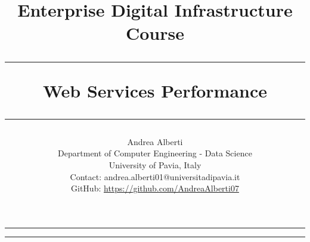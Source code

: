 \documentclass[a4paper,10pt]{article}
\title{\Large {Enterprise Digital Infrastructure Course} \vspace{0.2cm}
     \rule{\textwidth}{0.3pt} \vspace{0.0cm} %
     \textbf{Web Services Performance} \vspace{0.0cm} %
     \rule{\textwidth}{0.3pt}}
\author{Andrea Alberti \vspace{0.1cm}\\
        \small Department of Computer Engineering - Data Science \vspace{0.2cm}\\
        \small University of Pavia, Italy \vspace{0.2cm}\\
        \small Contact: andrea.alberti01@universitadipavia.it\\
        \small GitHub: \small \url{https://github.com/AndreaAlberti07}}
\begin{document}

\begin{titlepage}
        \maketitle 
        \thispagestyle{empty} 
\begin{multicols*}{2}

\hrule
\tableofcontents
\newcolumn
\hrule
\begin{abstract}
        \noindent
        
\end{abstract}


        
\end{multicols*}
\end{titlepage}


\newpage
\listoffigures
\listoftables
\end{document}
